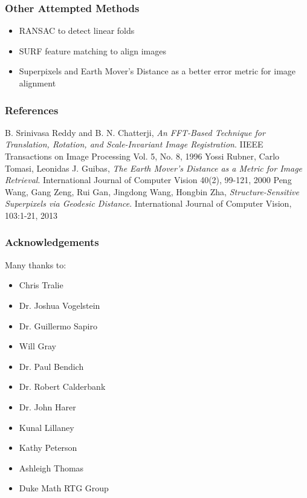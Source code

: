 \documentclass{beamer}
\begin{document}
\begin{frame}
\frametitle{Other Attempted Methods}
\begin{itemize}
\item RANSAC to detect linear folds
\item SURF feature matching to align images
\item Superpixels and Earth Mover's Distance as a better error metric for image alignment
\end{itemize}
\end{frame}

\begin{frame}
\frametitle{References}
\begin{thebibliography}{9}
	B. Srinivasa Reddy and B. N. Chatterji,
	\emph{An FFT-Based Technique for Translation, Rotation, and Scale-Invariant Image Registration}.
	IIEEE Transactions on Image Processing Vol. 5, No. 8, 1996
	Yossi Rubner, Carlo Tomasi, Leonidas J. Guibas,
	\emph{The Earth Mover's Distance as a Metric for Image Retrieval}.
	International Journal of Computer Vision 40(2), 99-121, 2000
	Peng Wang, Gang Zeng, Rui Gan, Jingdong Wang, Hongbin Zha,
	\emph{Structure-Sensitive Superpixels via Geodesic Distance}.
	International Journal of Computer Vision, 103:1-21, 2013
\end{thebibliography} 
\end{frame}

\begin{frame}
\frametitle{Acknowledgements}
Many thanks to:
\begin{itemize}
\item Chris Tralie
\item Dr. Joshua Vogelstein
\item Dr. Guillermo Sapiro
\item Will Gray 
\item Dr. Paul Bendich 
\item Dr. Robert Calderbank
\item Dr. John Harer
\item Kunal Lillaney
\item Kathy Peterson 
\item Ashleigh Thomas 
\item Duke Math RTG Group 
\end{itemize}
\end{frame}
\end{document}
